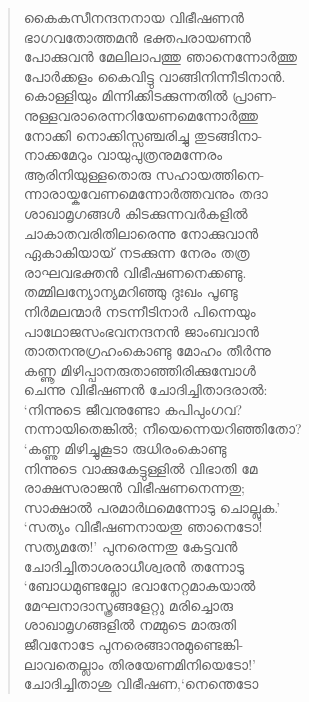 \begin{verse}
കൈകസീനന്ദനനായ വിഭീഷണന്‍\\
ഭാഗവതോത്തമന്‍ ഭക്തപരായണന്‍\\
പോക്കുവന്‍ മേലിലാപത്തു ഞാനെന്നോര്‍ത്തു\\
പോര്‍ക്കളം കൈവിട്ടു വാങ്ങിനിന്നീടിനാന്‍.\\
കൊള്ളിയും മിന്നിക്കിടക്കുന്നതില്‍ പ്രാണ-\\
നുള്ളവരാരെന്നറിയേണമെന്നോര്‍ത്തു\\
നോക്കി നൊക്കിസ്സഞ്ചരിച്ചു തുടങ്ങിനാ-\\
നാക്കമേറും വായുപുത്രനുമന്നേരം\\
ആരിനിയുള്ളതൊരു സഹായത്തിനെ-\\
ന്നാരായ്കവേണമെന്നോര്‍ത്തവനും തദാ\\
ശാഖാമൃഗങ്ങള്‍ കിടക്കുന്നവര്‍കളില്‍\\
ചാകാതവരിതിലാരെന്നു നോക്കുവാന്‍\\
ഏകാകിയായ് നടക്കുന്ന നേരം തത്ര\\
രാഘവഭക്തന്‍ വിഭീഷണനെക്കണ്ടു.\\
തമ്മിലന്യോന്യമറിഞ്ഞു ദുഃഖം പൂണ്ടു\\
നിര്‍മലന്മാര്‍ നടന്നീടിനാര്‍ പിന്നെയും\\
പാഥോജസംഭവനന്ദനന്‍ ജാംബവാന്‍\\
താതനനുഗ്രഹംകൊണ്ടു മോഹം തീര്‍ന്നു\\
കണ്ണൂ മിഴിപ്പാനരുതാഞ്ഞിരിക്കുമ്പോള്‍\\
ചെന്നു വിഭീഷണന്‍ ചോദിച്ചിതാദരാല്‍:\\
‘നിന്നുടെ ജീവനുണ്ടോ കപിപുംഗവ?\\
നന്നായിതെങ്കില്‍; നീയെന്നെയറിഞ്ഞിതോ?\\
‘കണ്ണു മിഴിച്ചുകൂടാ രുധിരംകൊണ്ടു\\
നിന്നുടെ വാക്കുകേട്ടുള്ളില്‍ വിഭാതി മേ\\
രാക്ഷസരാജന്‍ വിഭീഷണനെന്നതു;\\
സാക്ഷാല്‍ പരമാര്‍ഥമെന്നോടു ചൊല്ലുക.’\\
‘സത്യം വിഭീഷണനായതു ഞാനെടോ!\\
സത്യമതേ!’ പുനരെന്നതു കേട്ടവന്‍\\
ചോദിച്ചിതാശരാധീശ്വരന്‍ തന്നോടു\\
‘ബോധമുണ്ടല്ലോ ഭവാനേറ്റമാകയാല്‍\\
മേഘനാദാസ്ത്രങ്ങളേറ്റു മരിച്ചൊരു\\
ശാഖാമൃഗങ്ങളില്‍ നമ്മുടെ മാരുതി\\
ജീവനോടേ പുനരെങ്ങാനുമുണ്ടെങ്കി-\\
ലാവതെല്ലാം തിരയേണമിനിയെടോ!’\\
ചോദിച്ചിതാശു വിഭീഷണ,‘നെന്തെടോ\\

\end{verse}
